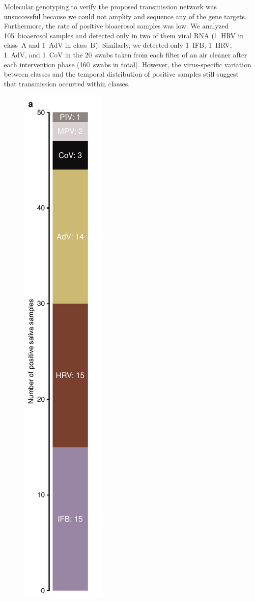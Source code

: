 \documentclass[fleqn,11pt]{wlscirep}
\begin{document}
Molecular genotyping to verify the proposed transmission network was unsuccessful because we could not amplify and sequence any of the gene targets. Furthermore, the rate of positive bioaerosol samples was low. We analyzed 105~bioaerosol samples and detected only in two of them viral RNA (1~HRV in class~A and 1~AdV in class~B). Similarly, we detected only 1~IFB, 1~HRV, 1~AdV, and 1~CoV in the 20~swabs taken from each filter of an air cleaner after each intervention phase (160~swabs in total). However, the virus-specific variation between classes and the temporal distribution of positive samples still suggest that transmission occurred within classes. 


\begin{figure}[!htpb]
    \centering
    \includegraphics{../../results/mol-data/saliva-distribution.pdf}\hspace{.5cm}

\end{figure}
\end{document}
